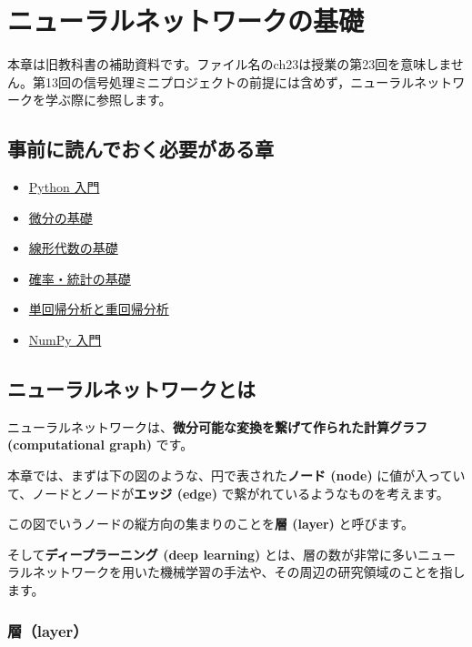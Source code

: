 \chapter{ニューラルネットワークの基礎}


本章は旧教科書の補助資料です。ファイル名のch23は授業の第23回を意味しません。第13回の信号処理ミニプロジェクトの前提には含めず，ニューラルネットワークを学ぶ際に参照します。

\section{事前に読んでおく必要がある章}


\begin{itemize}
\item \href{markdown/ch02-basics-of-python.md}{Python 入門}
\item \href{markdown/ch04-basics-of-differential.md}{微分の基礎}
\item \href{markdown/ch06a-basics-of-linear-algebra.md}{線形代数の基礎}
\item \href{markdown/ch06b-basics-of-probability-statistics.md}{確率・統計の基礎}
\item \href{markdown/ch21-regression-analysis.md}{単回帰分析と重回帰分析}
\item \href{markdown/ch03-reviewing-elementary-math-with-numpy-and-matplotlib.md}{NumPy 入門}
\end{itemize}


\section{ニューラルネットワークとは}


ニューラルネットワークは、\textbf{微分可能な変換を繋げて作られた計算グラフ (computational graph)} です。

本章では、まずは下の図のような、円で表された\textbf{ノード (node)} に値が入っていて、ノードとノードが\textbf{エッジ (edge)} で繋がれているようなものを考えます。


この図でいうノードの縦方向の集まりのことを\textbf{層 (layer)} と呼びます。

そして\textbf{ディープラーニング (deep learning)} とは、層の数が非常に多いニューラルネットワークを用いた機械学習の手法や、その周辺の研究領域のことを指します。




\subsection{層（layer）}


